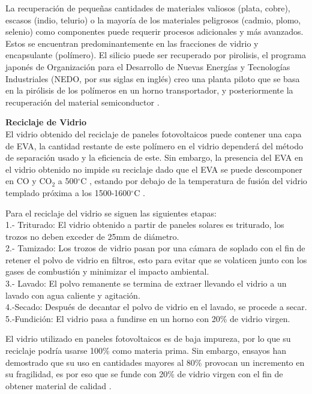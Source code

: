 La recuperación de pequeñas cantidades de materiales valiosos (plata, cobre), escasos (indio, telurio) o la mayoría de los materiales peligrosos (cadmio, plomo, selenio) como componentes puede requerir procesos adicionales y más avanzados. Estos se encuentran predominantemente en las fracciones de vidrio y encapsulante (polímero). El silicio puede ser recuperado por pirolisis, el programa japonés de Organización para el Desarrollo de Nuevas Energías y Tecnologías Industriales (NEDO, por sus siglas en inglés) creo una planta piloto que se basa en la pirólisis de los polímeros en un horno transportador, y posteriormente la recuperación del material semiconductor \citep{Irena2016}.

\textbf{Reciclaje de Vidrio}\\
El vidrio obtenido del reciclaje de paneles fotovoltaicos puede contener una capa de EVA, la cantidad restante de este polímero en el vidrio dependerá del método de separación usado y la eficiencia de este. Sin embargo, la presencia del EVA en el vidrio obtenido no impide su reciclaje dado que el EVA se puede descomponer en CO y CO$_{2}$ a 500$^{\circ}$C \citep{Fiandra2019}, estando por debajo de la temperatura de fusión del vidrio templado próxima a los 1500-1600$^{\circ}$C \citep{Herrarte2020,RaKim2017}. 

Para el reciclaje del vidrio se siguen las siguientes etapas: \\
1.- Triturado: El vidrio obtenido a partir de paneles solares es triturado, los trozos no deben exceder de 25mm de diámetro. \\
2.- Tamizado: Los trozos de vidrio pasan por una cámara de soplado con el fin de retener el polvo de vidrio en filtros, esto para evitar que se volaticen junto con los gases de combustión y minimizar el impacto ambiental.\\
3.- Lavado: El polvo remanente se termina de extraer llevando el vidrio a un lavado con agua caliente y agitación. \\
4.-Secado: Después de decantar el polvo de vidrio en el lavado, se procede a secar.\\ 
5.-Fundición: El vidrio pasa a fundirse en un horno con 20\% de vidrio virgen.

El vidrio utilizado en paneles fotovoltaicos es de baja impureza, por lo que su reciclaje podría usarse 100\% como materia prima. Sin embargo, ensayos han demostrado que su uso en cantidades mayores al 80\% provocan un incremento en su fragilidad, es por eso que se funde con 20\% de vidrio virgen con el fin de obtener material de calidad \citep{RaKim2017}.      

